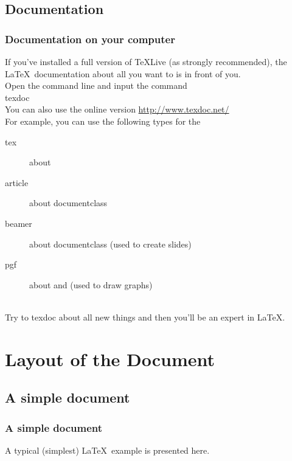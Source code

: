 \subsection{Documentation}

\begin{frame}
	\frametitle{Documentation on your computer}
	If you've installed a full version of \TeX Live (as strongly recommended), the \LaTeX\ documentation about all you want to is in front of you.\\[0.5em]
	Open the command line and input the command\\
	\alert{texdoc} \\[0.5em]
	You can also use the online version \url{http://www.texdoc.net/}\\[0.5em]
	For example, you can use the following types for the 
	\begin{description}
		\item[tex] 		about \\
		\item[article] 	about documentclass \\
		\item[beamer] 	about documentclass  (used to create slides)\\
		\item[pgf]		about  and  (used to draw graphs)\\
	\end{description}
	\ \\[-0.5em]
	Try to \alert{texdoc} about all new things and then you'll be an expert in \LaTeX.
\end{frame}

\section{Layout of the Document}
\begin{frame}
\end{frame}

\subsection{A simple document}

\begin{frame}
	\frametitle{A simple document}
	A typical (simplest) \LaTeX\ example is presented here.
	\begin{example}
		\inputminted{latex}{examples/simple.tex}
	\end{example}
\end{frame}

